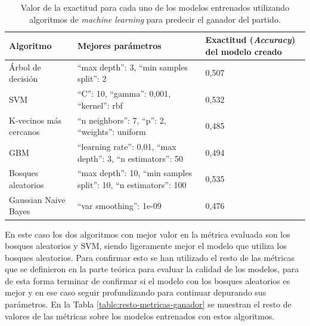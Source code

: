 \begin{table}[]
    \centering
    \begin{tabularx}{\textwidth}{|l|>{\raggedright\arraybackslash}X|l|}
        \hline
        \rowcolor[HTML]{C0C0C0}
        Algoritmo              & Mejores parámetros                                               & Exactitud (\textit{Accuracy}) del modelo creado \\ \hline
        Árbol de decisión      & ``max depth'': 3, ``min samples split'': 2                               & 0,507                                  \\ \hline
        SVM                    & ``C'': 10, ``gamma'': 0,001, ``kernel'': rbf                                 & 0,532                                  \\ \hline
        K-vecinos más cercanos & ``n neighbors'': 7, ``p'': 2, ``weights'': uniform                           & 0,485                                  \\ \hline
        GBM                   & ``learning rate'': 0,01, ``max depth'': 3, ``n estimators'': 50              & 0,494                                  \\ \hline
        Bosques aleatorios     & ``max depth'': 10, ``min samples split'': 10, ``n estimators'': 100          & 0,535                                  \\ \hline
        Gaussian Naive Bayes   & ``var smoothing'': 1e-09                                             & 0,476                                  \\ \hline
    \end{tabularx}
    \caption{Valor de la exactitud para cada uno de los modelos entrenados utilizando algoritmos de \textit{machine learning} para predecir el ganador del partido.}
    \label{table:exactitud-ganador}
\end{table}

En este caso los dos algoritmos con mejor valor en la métrica evaluada son los bosques aleatorios y SVM, siendo ligeramente mejor el modelo que utiliza los bosques aleatorios. Para confirmar esto se han utilizado el resto de las métricas que se definieron en la parte teórica para evaluar la calidad de los modelos, para de esta forma terminar de confirmar si el modelo con los bosques aleatorios es mejor y en ese caso seguir profundizando para continuar depurando sus parámetros. En la Tabla \ref{table:resto-metricas-ganador} se muestran el resto de valores de las métricas sobre los modelos entrenados con estos algoritmos.

